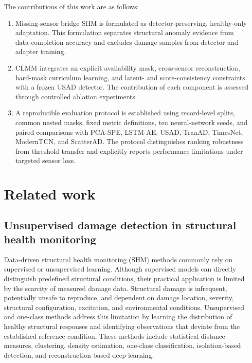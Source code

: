 \documentclass[a4paper,fleqn]{cas-sc}
\begin{document}
The contributions of this work are as follows:
\begin{enumerate}
	\item Missing-sensor bridge SHM is formulated as detector-preserving, healthy-only adaptation. This formulation separates structural anomaly evidence from data-completion accuracy and excludes damage samples from detector and adapter training.
	
	\item CLMM integrates an explicit availability mask, cross-sensor reconstruction, hard-mask curriculum learning, and latent- and score-consistency constraints with a frozen USAD detector. The contribution of each component is assessed through controlled ablation experiments.
	
	\item A reproducible evaluation protocol is established using record-level splits, common nested masks, fixed metric definitions, ten neural-network seeds, and paired comparisons with PCA-SPE, LSTM-AE, USAD, TranAD, TimesNet, ModernTCN, and ScatterAD. The protocol distinguishes ranking robustness from threshold transfer and explicitly reports performance limitations under targeted sensor loss.
\end{enumerate}

\section{Related work}
\label{sec:related}
\subsection{Unsupervised damage detection in structural health monitoring}
\label{subsec:unsupervised-shm}

Data-driven structural health monitoring (SHM) methods commonly rely on supervised or unsupervised learning. Although supervised models can directly distinguish predefined structural conditions, their practical application is limited by the scarcity of measured damage data. Structural damage is infrequent, potentially unsafe to reproduce, and dependent on damage location, severity, structural configuration, excitation, and environmental conditions. Unsupervised and one-class methods address this limitation by learning the distribution of healthy structural responses and identifying observations that deviate from the established reference condition. These methods include statistical distance measures, clustering, density estimation, one-class classification, isolation-based detection, and reconstruction-based deep learning.
\end{document}
